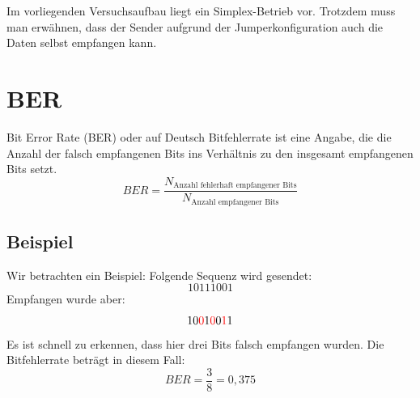 Im vorliegenden Versuchsaufbau liegt ein Simplex-Betrieb vor. 
Trotzdem muss man erwähnen, dass der Sender aufgrund der Jumperkonfiguration auch die Daten selbst empfangen kann.

\section{BER}
Bit Error Rate (BER) oder auf Deutsch Bitfehlerrate ist eine Angabe, die die
Anzahl der falsch empfangenen Bits ins Verhältnis zu den insgesamt empfangenen Bits setzt.
\begin{equation}
    BER = \frac{N_{\text{Anzahl fehlerhaft empfangener Bits}}}{N_{\text{Anzahl empfangener Bits}}}
\end{equation}
\subsection{Beispiel}
Wir betrachten ein Beispiel: Folgende Sequenz wird gesendet:
\begin{equation}
    10111001
\end{equation}
Empfangen wurde aber:
\begin{equation}
      10\textcolor{red}{0}1\textcolor{red}{0}0\textcolor{red}{1}1
\end{equation}
Es ist schnell zu erkennen, dass hier drei Bits falsch empfangen wurden.
Die Bitfehlerrate beträgt in diesem Fall:
\begin{equation}
    BER = \frac{3}{8} = 0{,}375
\end{equation}
